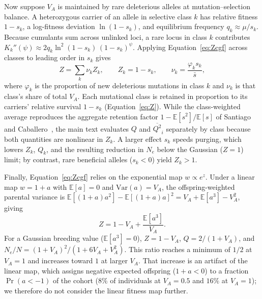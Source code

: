\documentclass{article}
\begin{document}
Now suppose $V_A$ is maintained by rare deleterious alleles at mutation--selection balance. A heterozygous carrier of an allele in selective class $k$ has relative fitness $1 - s_k$, a log-fitness deviation $\ln(1 - s_k)$, and equilibrium frequency $q_k \approx \mu/s_k$. Because cumulants sum across unlinked loci, a rare locus in class $k$ contributes $K_k''(\psi) \approx 2q_k \ln^2(1 - s_k)\,(1 - s_k)^{\psi}$. Applying Equation~\eqref{eq:Zcgf} across classes to leading order in $s_k$ gives
\begin{equation}
    Z = \sum_k \nu_k Z_k, \qquad Z_k = 1 - s_k, \qquad \nu_k = \frac{\varphi_k s_k}{\bar{s}}, \label{eq:Zclass}
\end{equation}
where $\varphi_k$ is the proportion of new deleterious mutations in class $k$ and $\nu_k$ is that class's share of total $V_A$. Each mutational class is retained in proportion to its carriers' relative survival $1 - s_k$ (Equation~\eqref{eq:Z}). While the class-weighted average reproduces the aggregate retention factor $1 - \mathbb{E}[s^2]/\mathbb{E}[s]$ of Santiago and Caballero~\cite{santiago1998}, the main text evaluates $Q$ and $\overline{Q^2}_i$ separately by class because both quantities are nonlinear in $Z_k$. A larger effect $s_k$ speeds purging, which lowers $Z_k$, $Q_k$, and the resulting reduction in $N_e$ below the Gaussian ($Z=1$) limit; by contrast, rare beneficial alleles ($s_k < 0$) yield $Z_k > 1$.

Finally, Equation~\eqref{eq:Zcgf} relies on the exponential map $w \propto e^z$. Under a linear map $w = 1 + a$ with $\mathbb{E}[a] = 0$ and $\mathrm{Var}(a) = V_A$, the offspring-weighted parental variance is $\mathbb{E}[(1 + a)a^2] - \mathbb{E}[(1 + a)a]^2 = V_A + \mathbb{E}[a^3] - V_A^2$, giving
\begin{equation}
    Z = 1 - V_A + \frac{\mathbb{E}[a^3]}{V_A}. \label{eq:Zarch}
\end{equation}
For a Gaussian breeding value ($\mathbb{E}[a^3] = 0$), $Z = 1 - V_A$, $Q = 2/(1 + V_A)$, and $N_e/N = (1 + V_A)^2/(1 + 6V_A + V_A^2)$. This ratio reaches a minimum of $1/2$ at $V_A = 1$ and increases toward $1$ at larger $V_A$. That increase is an artifact of the linear map, which assigns negative expected offspring ($1 + a < 0$) to a fraction $\Pr(a < -1)$ of the cohort ($8\%$ of individuals at $V_A = 0.5$ and $16\%$ at $V_A = 1$); we therefore do not consider the linear fitness map further.

\ifdefined\isMainDocument
\else
    \printbibliography
    
\end{document}
